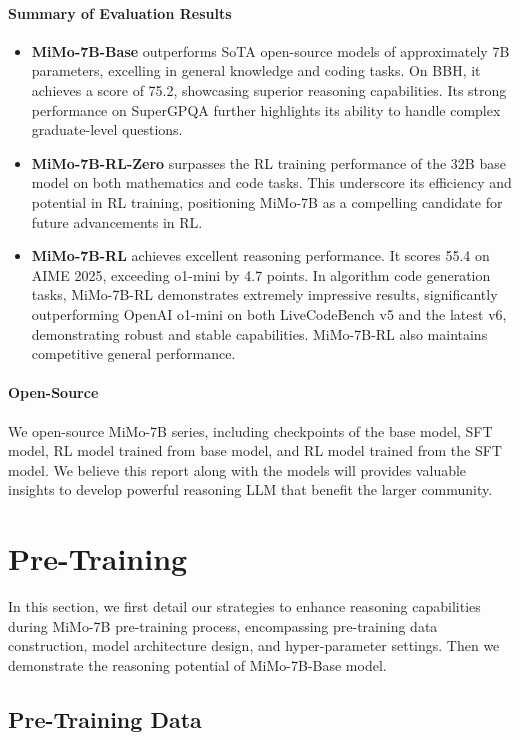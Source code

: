 \documentclass[11pt, a4paper, logo, copyright, nonumbering]{xiaomi}
\newcommand{\mimo}{MiMo-7B}
\newcommand{\mimobase}{MiMo-7B-Base}
\newcommand{\mimozero}{MiMo-7B-RL-Zero}
\newcommand{\mimorl}{MiMo-7B-RL}
\begin{document}
\paragraph{Summary of Evaluation Results}
\begin{itemize}
    \item \textbf{\mimobase{}} outperforms SoTA open-source models of approximately 7B parameters, excelling in general knowledge and coding tasks. On BBH, it achieves a score of 75.2, showcasing superior reasoning capabilities. Its strong performance on SuperGPQA further highlights its ability to handle complex graduate-level questions.
    \item \textbf{\mimozero{}} surpasses the RL training performance of the 32B base model on both mathematics and code tasks. This underscore its efficiency and potential in RL training, positioning \mimo{} as a compelling candidate for future advancements in RL.
    \item \textbf{\mimorl{}} achieves excellent reasoning performance. It scores 55.4 on AIME 2025, exceeding o1-mini by 4.7 points. In algorithm code generation tasks, \mimorl{} demonstrates extremely impressive results, significantly outperforming OpenAI o1-mini on both LiveCodeBench v5 and the latest v6, demonstrating robust and stable capabilities. \mimorl{} also maintains competitive general performance.
\end{itemize}

\paragraph{Open-Source}
We open-source \mimo{} series, including checkpoints of the base model, SFT model, RL model trained from base model, and RL model trained from the SFT model.
We believe this report along with the models will provides valuable insights to develop powerful reasoning LLM that benefit the larger community.

\section{Pre-Training}
\label{sec:pretrain}


In this section, we first detail our strategies to enhance reasoning capabilities during \mimo{} pre-training process, encompassing pre-training data construction, model architecture design, and hyper-parameter settings. 
Then we demonstrate the reasoning potential of \mimobase{} model.

\subsection{Pre-Training Data}
\label{sec:data}
\end{document}
